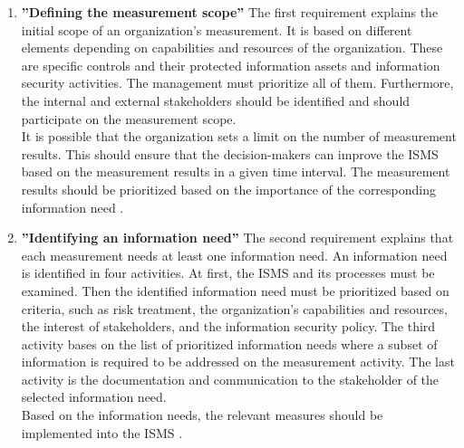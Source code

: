 \begin{enumerate}[label=(\alph*)]
  \item \label{itm:a} \textbf{''Defining the measurement scope''}
  The first requirement explains the initial scope of an organization's measurement. It is based on different elements depending on capabilities and resources of the organization. These are specific controls and their protected information assets and information security activities. The management must prioritize all of them. Furthermore, the internal and external stakeholders should be identified and should participate on the measurement scope. \\
  It is possible that the organization sets a limit on the number of measurement results. This should ensure that the decision-makers can improve the ISMS based on the measurement results in a given time interval. The measurement results should be prioritized based on the importance of the corresponding information need \cite{ISO_27004_2009}. \\

  \item \label{itm:b} \textbf{''Identifying an information need''}
  The second requirement explains that each measurement needs at least one information need. An information need is identified in four activities. At first, the ISMS and its processes must be examined. Then the identified information need must be prioritized based on criteria, such as risk treatment, the organization's capabilities and resources, the interest of stakeholders, and the information security policy. The third activity bases on the list of prioritized information needs where a subset of information is required to be addressed on the measurement activity. The last activity is the documentation and communication to the stakeholder of the selected information need. \\
  Based on the information needs, the relevant measures should be implemented into the ISMS \cite{ISO_27004_2009}. \\


\end{enumerate}
